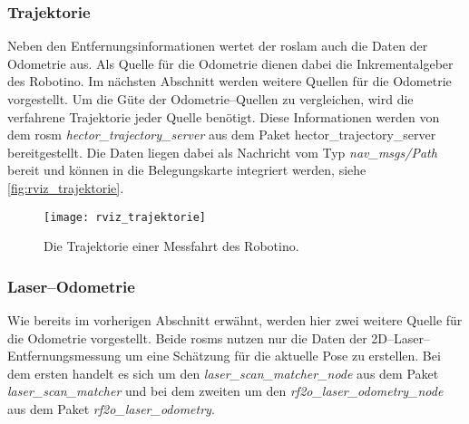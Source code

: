 \begin{comment}
--------------------------------------------------------------------------------
- \url{http://wiki.ros.org/hector_trajectory_server}
- \url{http://docs.ros.org/api/nav_msgs/html/msg/Path.html}
\end{comment}
\subsubsection{Trajektorie}

Neben den Entfernungsinformationen wertet der \Gls{roslam} auch die Daten der Odometrie aus. Als Quelle für die Odometrie dienen dabei die Inkrementalgeber des Robotino. Im nächsten Abschnitt werden weitere Quellen für die Odometrie vorgestellt. Um die Güte der Odometrie--Quellen zu vergleichen, wird die verfahrene Trajektorie jeder Quelle benötigt. Diese Informationen werden von dem \Gls{rosm} \textit{hector\_trajectory\_server} aus dem Paket {hector\_trajectory\_server} bereitgestellt. Die Daten liegen dabei als Nachricht vom Typ \textit{nav\_msgs/Path} bereit und können in die Belegungskarte integriert werden, siehe \autoref{fig:rviz_trajektorie}.

\begin{figure}[h]
	\centering
	\texttt{[image: rviz\_trajektorie]}
	\caption{Die Trajektorie einer Messfahrt des Robotino.}
	\label{fig:rviz_trajektorie}
\end{figure}


\begin{comment}
--------------------------------------------------------------------------------
- \url{http://wiki.ros.org/rf2o}
- \url{http://wiki.ros.org/laser_scan_matcher}
\end{comment}
\subsubsection{Laser--Odometrie}

Wie bereits im vorherigen Abschnitt erwähnt, werden hier zwei weitere Quelle für die Odometrie vorgestellt. Beide \Glspl{rosm} nutzen nur die Daten der 2D--Laser--Ent\-fern\-ungs\-mes\-sung um eine Schätzung für die aktuelle Pose zu erstellen. Bei dem ersten handelt es sich um den \textit{laser\_scan\_matcher\_node} aus dem Paket \textit{laser\_scan\_matcher} und bei dem zweiten um den \textit{rf2o\_laser\_odometry\_node} aus dem Paket \textit{rf2o\_laser\_odometry}.


